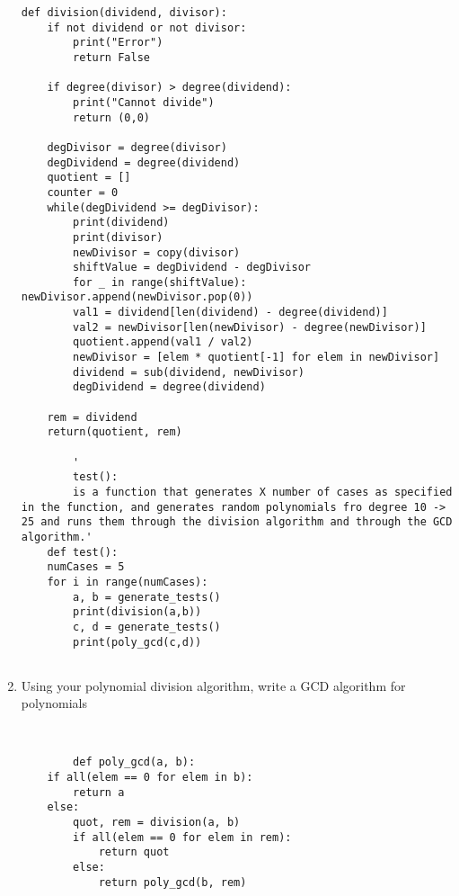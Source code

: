 \documentclass[12pt]{article}
\begin{document}
\begin{enumerate}
\begin{lstlisting}
def division(dividend, divisor):
    if not dividend or not divisor:
        print("Error")
        return False

    if degree(divisor) > degree(dividend):
        print("Cannot divide")
        return (0,0)

    degDivisor = degree(divisor)
    degDividend = degree(dividend)
    quotient = [] 
    counter = 0
    while(degDividend >= degDivisor):
        print(dividend)
        print(divisor)
        newDivisor = copy(divisor)
        shiftValue = degDividend - degDivisor
        for _ in range(shiftValue): newDivisor.append(newDivisor.pop(0))
        val1 = dividend[len(dividend) - degree(dividend)]
        val2 = newDivisor[len(newDivisor) - degree(newDivisor)]
        quotient.append(val1 / val2)
        newDivisor = [elem * quotient[-1] for elem in newDivisor]
        dividend = sub(dividend, newDivisor)
        degDividend = degree(dividend)

    rem = dividend
    return(quotient, rem)

		'
		test():
		is a function that generates X number of cases as specified in the function, and generates random polynomials fro degree 10 -> 25 and runs them through the division algorithm and through the GCD algorithm.'
	def test():
    numCases = 5
    for i in range(numCases):
        a, b = generate_tests()
        print(division(a,b))
        c, d = generate_tests()
        print(poly_gcd(c,d))


	  \end{lstlisting}
	\item Using your polynomial division algorithm, write a GCD algorithm for polynomials
		\begin{lstlisting}
			

		def poly_gcd(a, b):
    if all(elem == 0 for elem in b):
        return a
    else:
        quot, rem = division(a, b)
        if all(elem == 0 for elem in rem):
            return quot
        else:
            return poly_gcd(b, rem)


		\end{lstlisting}
	

\end{enumerate}
\end{document}
